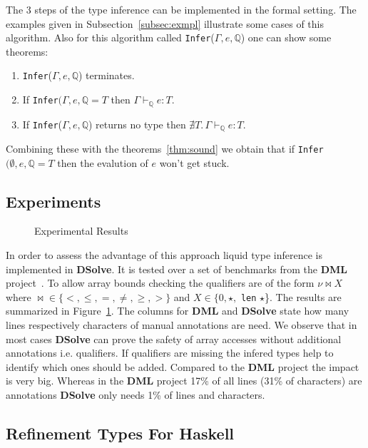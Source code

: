 \documentclass[a4paper,UKenglish]{lipics-v2016}
\begin{document}
The 3 steps of the type inference can be implemented in the formal setting.
The examples given in Subsection~\ref{subsec:exmpl} illustrate some cases of this algorithm.
Also for this algorithm called \lstinline{Infer}($\Gamma, e, \mathbb{Q}$) one can show some theorems:
\begin{enumerate}
    \item \lstinline{Infer}($\Gamma, e, \mathbb{Q}$) terminates.
    \item If \lstinline{Infer}$(\Gamma, e, \mathbb{Q} = T$ then $\Gamma \vdash_{\mathbb{Q}} e: T$.
    \item If \lstinline{Infer}($\Gamma, e, \mathbb{Q}$) returns no type then $\nexists T.\, \Gamma \vdash_{\mathbb{Q}} e: T$.
\end{enumerate}

Combining these with the theorems~\ref{thm:sound} we obtain that if \lstinline{Infer}$(\emptyset, e, \mathbb{Q} = T$ then the evalution of $e$ won't get stuck.

\subsection{Experiments}

\begin{figure}
    \caption{Experimental Results}
    \label{fig:exp}
\end{figure}

In order to assess the advantage of this approach liquid type inference is implemented in \textbf{DSolve}.
It is tested over a set of benchmarks from the \textbf{DML} project~\cite{Xi:1998:EAB}.
To allow array bounds checking the qualifiers are of the form $\nu \bowtie X$ where $\bowtie \in \{<, \le, =, \neq, \geq, >\}$ and $X \in \{0, \star,$ \lstinline{len} $\star$\}.
The results are summarized in Figure~\ref{fig:exp}.
The columns for \textbf{DML} and \textbf{DSolve} state how many lines respectively characters of manual annotations are need.
We observe that in most cases \textbf{DSolve} can prove the safety of array accesses without additional annotations i.e. qualifiers.
If qualifiers are missing the infered types help to identify which ones should be added.
Compared to the \textbf{DML} project the impact is very big.
Whereas in the \textbf{DML} project 17\% of all lines (31\% of characters) are annotations \textbf{DSolve} only needs 1\% of lines and characters.

  \subsection{Refinement Types For Haskell}
\end{document}
